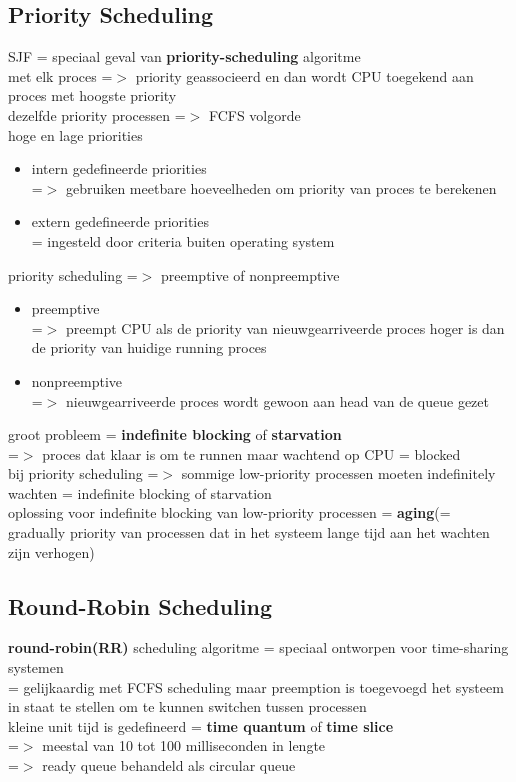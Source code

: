\documentclass{report}
\begin{document}
\subsection{Priority Scheduling}
SJF = speciaal geval van \textbf{priority-scheduling} algoritme
\\met elk proces =$>$ priority geassocieerd en dan wordt CPU toegekend aan proces met hoogste priority
\\dezelfde priority processen =$>$ FCFS volgorde 
\\hoge en lage priorities
\begin{itemize}
\item intern gedefineerde priorities
\\=$>$ gebruiken meetbare hoeveelheden om priority van proces te berekenen
\item extern gedefineerde priorities
\\ = ingesteld door criteria buiten operating system
\end{itemize}
priority scheduling =$>$ preemptive of nonpreemptive
\begin{itemize}
\item preemptive
\\ =$>$ preempt CPU als de priority van nieuwgearriveerde proces hoger is dan de priority van huidige running proces
\item nonpreemptive
\\ =$>$ nieuwgearriveerde proces wordt gewoon aan head van de queue gezet
\end{itemize}
groot probleem = \textbf{indefinite blocking} of \textbf{starvation} 
\\=$>$ proces dat klaar is om te runnen maar wachtend op CPU = blocked
\\bij priority scheduling =$>$ sommige low-priority processen moeten indefinitely wachten = indefinite blocking of starvation
\\oplossing voor indefinite blocking van low-priority processen = \textbf{aging}(= gradually priority van processen dat in het systeem lange tijd aan het wachten zijn verhogen)

\subsection{Round-Robin Scheduling}
\textbf{round-robin(RR)} scheduling algoritme = speciaal ontworpen voor time-sharing systemen
\\= gelijkaardig met FCFS scheduling maar preemption is toegevoegd het systeem in staat te stellen om te kunnen switchen tussen processen
\\kleine unit tijd is gedefineerd = \textbf{time quantum} of \textbf{time slice}
\\=$>$ meestal van 10 tot 100 milliseconden in lengte
\\=$>$ ready queue behandeld als circular queue
\end{document}
